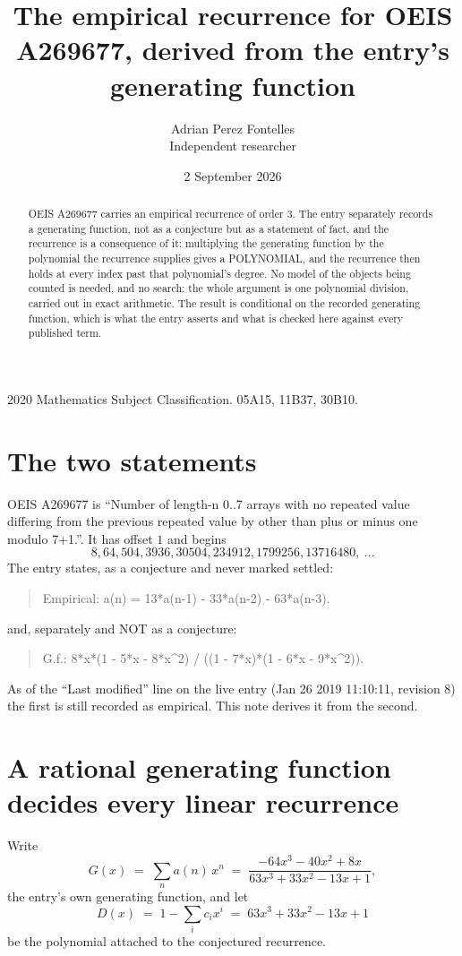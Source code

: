 \documentclass[11pt,a4paper]{article}
\title{The empirical recurrence for OEIS A269677, derived from the entry's generating function}
\author{Adrian Perez Fontelles\\ \small Independent researcher}
\date{2 September 2026}
\theoremstyle{plain}
\theoremstyle{definition}
\begin{document}
\maketitle

\begin{abstract}
OEIS A269677 carries an empirical recurrence of order $3$. The entry separately records a
generating function, not as a conjecture but as a statement of fact, and the recurrence is a
consequence of it: multiplying the generating function by the polynomial the recurrence
supplies gives a POLYNOMIAL, and the recurrence then holds at every index past that
polynomial's degree. No model of the objects being counted is needed, and no search: the
whole argument is one polynomial division, carried out in exact arithmetic. The result is
conditional on the recorded generating function, which is what the entry asserts and what is
checked here against every published term.
\end{abstract}

\noindent\small 2020 Mathematics Subject Classification. 05A15, 11B37, 30B10.\normalsize

\section{The two statements}

OEIS A269677 is ``Number of length-n 0..7 arrays with no repeated value differing from the previous repeated value by other than plus or minus one modulo 7+1.''. It has offset $1$ and begins
\[
8, 64, 504, 3936, 30504, 234912, 1799256, 13716480,\ \dots
\]
The entry states, as a conjecture and never marked settled:
\begin{quote}
Empirical: a(n) = 13*a(n-1) - 33*a(n-2) - 63*a(n-3).
\end{quote}
and, separately and NOT as a conjecture:
\begin{quote}
G.f.: 8*x*(1 - 5*x - 8*x\^{}2) / ((1 - 7*x)*(1 - 6*x - 9*x\^{}2)).
\end{quote}
As of the ``Last modified'' line on the live entry (Jan 26 2019 11:10:11, revision 8) the first is still
recorded as empirical. This note derives it from the second.

\section{A rational generating function decides every linear recurrence}

Write
\[
G(x)\;=\;\sum_{n}a(n)\,x^{n}\;=\;\frac{- 64 x^{3} - 40 x^{2} + 8 x}{63 x^{3} + 33 x^{2} - 13 x + 1},
\]
the entry's own generating function, and let
\[
D(x)\;=\;1-\sum_i c_i x^{i}\;=\;63 x^{3} + 33 x^{2} - 13 x + 1
\]
be the polynomial attached to the conjectured recurrence.
\end{document}
